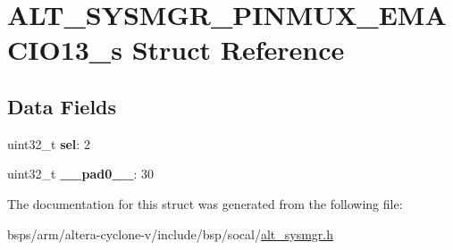 \hypertarget{structALT__SYSMGR__PINMUX__EMACIO13__s}{}\section{A\+L\+T\+\_\+\+S\+Y\+S\+M\+G\+R\+\_\+\+P\+I\+N\+M\+U\+X\+\_\+\+E\+M\+A\+C\+I\+O13\+\_\+s Struct Reference}
\label{structALT__SYSMGR__PINMUX__EMACIO13__s}
\subsection*{Data Fields}
\begin{DoxyCompactItemize}
\item 
\mbox{\label{structALT__SYSMGR__PINMUX__EMACIO13__s_a7f40b2a4a811ee6d869f339aa33bb514}} 
uint32\+\_\+t {\bfseries sel}\+: 2
\item 
\mbox{\label{structALT__SYSMGR__PINMUX__EMACIO13__s_a0636dfe9df546945aeb3c28c85517e42}} 
uint32\+\_\+t {\bfseries \+\_\+\+\_\+pad0\+\_\+\+\_\+}\+: 30
\end{DoxyCompactItemize}


The documentation for this struct was generated from the following file\+:\begin{DoxyCompactItemize}
\item 
bsps/arm/altera-\/cyclone-\/v/include/bsp/socal/\mbox{\hyperlink{alt__sysmgr_8h}{alt\+\_\+sysmgr.\+h}}\end{DoxyCompactItemize}
